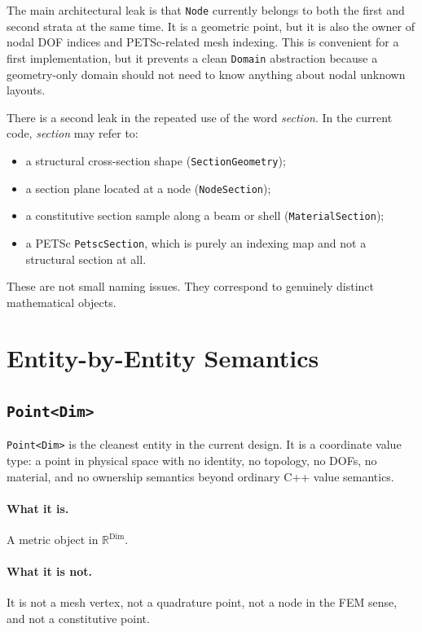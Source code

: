 The main architectural leak is that \texttt{Node} currently belongs to both
the first and second strata at the same time.  It is a geometric point, but
it is also the owner of nodal DOF indices and PETSc-related mesh indexing.
This is convenient for a first implementation, but it prevents a clean
\texttt{Domain} abstraction because a geometry-only domain should not need to
know anything about nodal unknown layouts.

There is a second leak in the repeated use of the word \emph{section}.  In the
current code, \emph{section} may refer to:

\begin{itemize}[nosep]
  \item a structural cross-section shape (\texttt{SectionGeometry});
  \item a section plane located at a node (\texttt{NodeSection});
  \item a constitutive section sample along a beam or shell
        (\texttt{MaterialSection});
  \item a PETSc \texttt{PetscSection}, which is purely an indexing map and not
        a structural section at all.
\end{itemize}

These are not small naming issues.  They correspond to genuinely distinct
mathematical objects.


\section{Entity-by-Entity Semantics}
\label{sec:domain-ontology-entities}

\subsection{\texttt{Point<Dim>}}

\texttt{Point<Dim>} is the cleanest entity in the current design.  It is a
coordinate value type: a point in physical space with no identity, no topology,
no DOFs, no material, and no ownership semantics beyond ordinary C++ value
semantics.

\paragraph{What it is.}
A metric object in \(\mathbb{R}^{\mathrm{Dim}}\).

\paragraph{What it is not.}
It is not a mesh vertex, not a quadrature point, not a node in the FEM sense,
and not a constitutive point.

